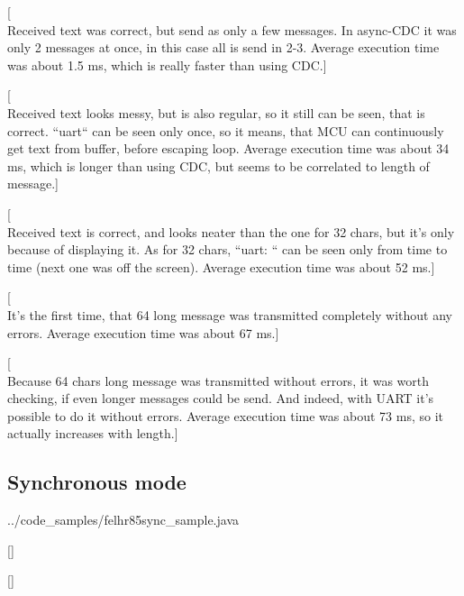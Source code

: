 [\\Received text was correct, but send as only a few messages. 
In async-CDC it was only 2 messages at once, in this case all is send in 2-3.
Average execution time was about 1.5 ms, which is really faster than using CDC.]

[\\Received text looks messy, but is also regular, so it still can be seen,
that is correct. ``uart`` can be seen only once, so it means, that MCU can
continuously get text from buffer, before escaping loop.
Average execution time was about 34 ms, which is longer than using CDC, but
seems to be correlated to length of message.]

[\\Received text is correct, and looks neater than the one for 32 chars, but
it's only because of displaying it. 
As for 32 chars, ``uart: `` can be seen only from time to time (next one was
off the screen).
Average execution time was about 52 ms.]

[\\It's the first time, that 64 long message was transmitted completely without
any errors.
Average execution time was about 67 ms.]

[\\Because 64 chars long message was transmitted without errors, it was worth
checking, if even longer messages could be send. 
And indeed, with UART it's possible to do it without errors.
Average execution time was about 73 ms, so it actually increases with length.]

\clearpage

\subsection{Synchronous mode}


{../code_samples/felhr85sync_sample.java}

[]

[]

